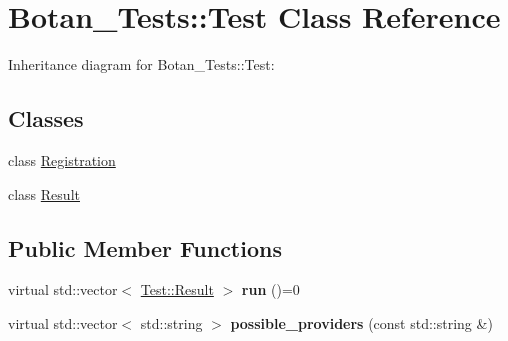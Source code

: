 \hypertarget{class_botan___tests_1_1_test}{}\section{Botan\+\_\+\+Tests\+:\+:Test Class Reference}
\label{class_botan___tests_1_1_test}


Inheritance diagram for Botan\+\_\+\+Tests\+:\+:Test\+:
\subsection*{Classes}
\begin{DoxyCompactItemize}
\item 
class \mbox{\hyperlink{class_botan___tests_1_1_test_1_1_registration}{Registration}}
\item 
class \mbox{\hyperlink{class_botan___tests_1_1_test_1_1_result}{Result}}
\end{DoxyCompactItemize}
\subsection*{Public Member Functions}
\begin{DoxyCompactItemize}
\item 
\mbox{\label{class_botan___tests_1_1_test_a7c7d5f1518b2113177f3b3f9dc8a4854}} 
virtual std\+::vector$<$ \mbox{\hyperlink{class_botan___tests_1_1_test_1_1_result}{Test\+::\+Result}} $>$ {\bfseries run} ()=0
\item 
\mbox{\label{class_botan___tests_1_1_test_a3206957c7e41d01d3aa29a7c2c929f03}} 
virtual std\+::vector$<$ std\+::string $>$ {\bfseries possible\+\_\+providers} (const std\+::string \&)
\end{DoxyCompactItemize}
